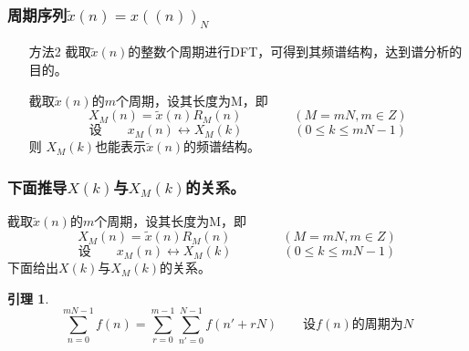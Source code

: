\documentclass[notheorems,compress,mathserif,table]{beamer}
\newtheorem{lemma}{引理}
\begin{document}
\begin{frame}[shrink]\frametitle{周期序列$\tilde{x}(n) = x((n))_N$}%
\begin{enumerate}
	\item [方法2]截取$\tilde{x}(n)$的整数个周期进行DFT，可得到其频谱结构，达到谱分析的目的。


    截取$\tilde{x}(n)$的$m$个周期，设其长度为M，即
    $$X_M(n) = \tilde{x}(n)R_M(n)\qquad\qquad  (M=mN,m\in Z)$$
    $$\mbox{设}\qquad x_M(n)\longleftrightarrow X_M(k)\qquad\qquad (0\leq k \leq mN-1)$$
    则
    $ X_M(k) $也能表示$ \tilde{x}(n) $的频谱结构。
\end{enumerate}    
\end{frame}    
    
\begin{frame}[shrink]\frametitle{下面推导$X(k)$与$X_M(k)$的关系。}%
截取$\tilde{x}(n)$的$m$个周期，设其长度为M，即
$$X_M(n) = \tilde{x}(n)R_M(n)\qquad\qquad  (M=mN,m\in Z)$$
$$\mbox{设}\qquad x_M(n)\longleftrightarrow X_M(k)\qquad\qquad (0\leq k \leq mN-1)$$
    下面给出$X(k)$与$X_M(k)$的关系。
  \begin{lemma}
    \begin{equation*}
    \sum_{n=0}^{mN-1}f(n) = \sum_{r=0}^{m-1}\sum_{n'=0}^{N-1}f(n'+rN) \qquad\mbox{设$f(n)$的周期为$N$}
    \end{equation*}
  \end{lemma}
\end{frame} 
\end{document}
